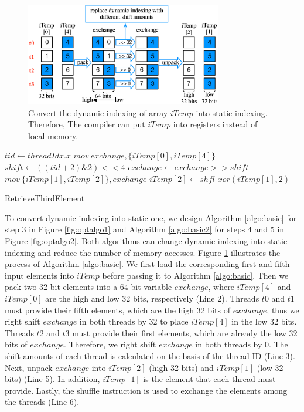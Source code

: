 \begin{figure}[t!]
	\centering
	\includegraphics[width=\columnwidth,height=4.5cm]{./figure/exchange.eps}
\caption{Convert the dynamic indexing of array $iTemp$ into static indexing. Therefore, The compiler can put $iTemp$ into registers instead of local memory.}
\label{fig:exchange}
\end{figure}


\begin{algorithm}[t!]
	$tid \gets threadIdx.x$\;
	$mov\ exchange, \{iTemp[0], iTemp[4]\}$\;
	$shift \gets ((tid+2)\&2)<<4$\;
	$exchange \gets exchange >> shift$\;
	$mov\ \{iTemp[1],iTemp[2]\}, exchange$\;
	$iTemp[2] \gets shfl\_xor(iTemp[1],2)$\;	
	
	\caption{RetrieveThirdElement}
	\label{algo:basic}
\end{algorithm}

To convert dynamic indexing into static one, we design Algorithm \ref{algo:basic} for step 3 in Figure \ref{fig:optalgo1} and Algorithm \ref{algo:basic2} for steps 4 and 5 in Figure \ref{fig:optalgo2}. Both algorithms can change dynamic indexing into static indexing and reduce the number of memory accesses. Figure \ref{fig:exchange} illustrates the process of Algorithm \ref{algo:basic}. We first load the corresponding first and fifth input elements into $iTemp$ before passing it to Algorithm \ref{algo:basic}. Then we pack two 32-bit elements into a 64-bit variable $exchange$, where $iTemp[4]$ and $iTemp[0]$ are the high and low 32 bits, respectively (Line 2).  Threads $t0$ and $t1$ must provide their fifth elements, which are the high 32 bits of $exchange$, thus we right shift $exchange$ in both threads by 32 to place $iTemp[4]$ in the low 32 bits. Threads $t2$ and $t3$ must provide their first elements, which are already the low 32 bits of $exchange$. Therefore, we right shift $exchange$ in both threads by 0. The shift amounts of each thread is calculated on the basis of the thread ID (Line 3). Next, unpack $exchange$ into $iTemp[2]$ (high 32 bits) and $iTemp[1]$ (low 32 bits) (Line 5). In addition, $iTemp[1]$ is the element that each thread must provide. Lastly, the shuffle instruction is used to exchange the elements among the threads (Line 6).

